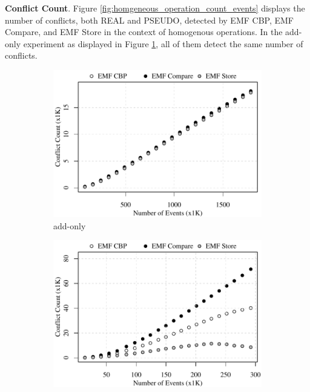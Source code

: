 \textbf{Conflict Count}. Figure \ref{fig:homgeneous_operation_count_events} displays the number of conflicts, both \textsf{REAL} and \textsf{PSEUDO}, detected by EMF CBP, EMF Compare, and EMF Store in the context of homogenous operations. In the add-only experiment as displayed in Figure \ref{fig:add-conflict-count-events}, all of them detect the same number of conflicts.

\begin{figure}[ht]
  \centering
  \begin{subfigure}[t]{0.490\linewidth}
    \includegraphics[width=\linewidth]{add-conflict-count-events}
    \caption{add-only}
    \label{fig:add-conflict-count-events}
  \end{subfigure}
  \hfill
  \begin{subfigure}[t]{0.490\linewidth}
    \includegraphics[width=\linewidth]{delete-conflict-count-events}

\end{subfigure}
\end{figure}
